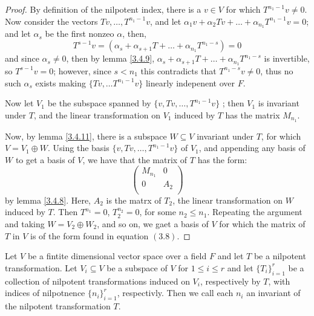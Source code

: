 \begin{proof}
    By definition of the nilpotent index, there is a $v \in V$ for which
    $T^{n_1-1}v \neq 0$. Now consider the vectors $Tv, \dots, T^{n_1-1}v$, and
    let $\alpha_1v+\alpha_2Tv+\dots+\alpha_{n_1}T^{n_1-1}v=0$; and let
    $\alpha_s$ be the first nonzeo  $\alpha$, then,
        \begin{equation*}
            T^{s-1}v=(\alpha_s+\alpha_{s+1}T+\dots+\alpha_{n_1}T^{n_1-s})=0
        \end{equation*}
    and since $\alpha_s \neq 0$, then by lemma \ref{3.4.9}, $\alpha_s+\alpha_{s+1}T+
    \dots+\alpha_{n_1}T^{n_1-s}$ is invertible, so $T^{s-1}v=0$; however, since
    $s<n_1$ this contradicts that $T^{n_1-s}v \neq 0$, thus no such $\alpha_s$
    exists making  $\{Tv, \dots T^{n_1-1}v\}$ linearly indepenent over $F$.

    Now let  $V_1$ be the subspace spanned by $\{v, Tv, \dots, T^ {n_1-1}v\}$ ;
    then $V_1$ is invariant under $T$, and the linear transformation on  $V_1$
    induced by $T$ has the matrix  $M_{n_1}$.

    Now, by lemma \ref{3.4.11}, there is a subspace $W \subseteq V$ invariant
    under  $T$, for which  $V=V_1 \oplus W$. Using the basis $\{v, Tv, \dots, T^ {n_1-
    1}v\}$ of $V_1$, and appending any basis of $W$ to get a basis of $V$, we
    have that the matrix of  $T$ has the form:
        \begin{equation*}
            \begin{pmatrix}
                M_{n_1} &   0   \\
                0       &   A_2 \\
            \end{pmatrix}
        \end{equation*}
    by lemma \ref{3.4.8}. Here, $A_2$ is the matrx of $T_2$, the linear
    transformation on $W$ induced by  $T$. Then $T^{n_1}=0$, $T_2^{n_2}=0$, for
    some $n_2 \leq n_1$. Repeating the argument and taking $W=V_2 \oplus W_2$,
    and so on, we gaet a basis of $V$ for which the matrix of  $T$ in  $V$ is
    of the form found in equation  $(3.8)$.
\end{proof}

\begin{definition}
    Let $V$ be a fintite dimensional vector space over a field  $F$ and let $T$
    be a nilpotent transformation. Let  $V_i \subseteq V$ be a subspace of  $V$
    for  $1 \leq i \leq r$ and let $\{T_i\}_{i=1}^r$ be a collection of nilpotent
    transformations induced on $V_i$, respectively by  $T$, with indices of
    nilpotnence $\{n_i\}_{i=1}^r$, respectivly. Then we call each $n_i$ an invariant
    of the nilpotent transformation $T$.
\end{definition}

